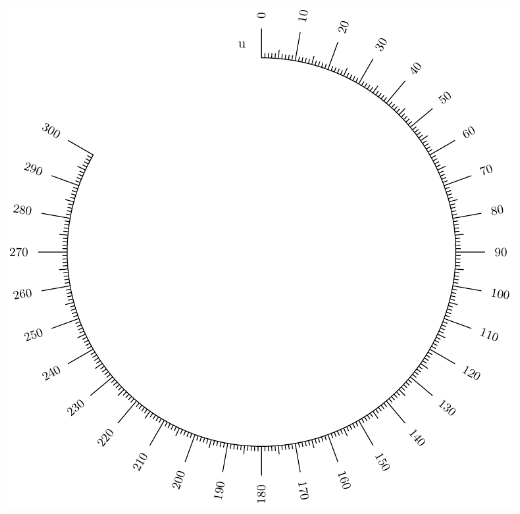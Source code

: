 \documentclass[a4paper,11pt,english]{sphinxmanual}
\begin{document}
\includegraphics{ex_axes_8.pdf}
\end{document}
